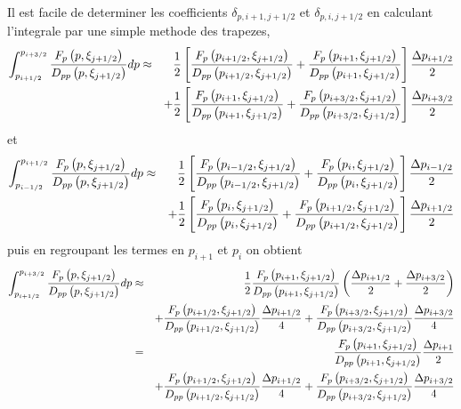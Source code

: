 Il est facile de determiner les coefficients $\delta_{p,i+1,j+1/2}$ et $%
\delta_{p,i,j+1/2}$ en calculant l'integrale par une simple methode des
trapezes, 
\begin{eqnarray*}
\int_{p_{i+1/2}}^{p_{i+3/2}}\frac{F_{p}\left(p,\xi_{j+1/2}\right)}{%
D_{pp}\left(p,\xi_{j+1/2}\right)}dp & \approx & \frac{1}{2}\left[\frac{%
F_{p}\left(p_{i+1/2},\xi_{j+1/2}\right)}{D_{pp}\left(p_{i+1/2},\xi_{j+1/2}%
\right)}+\frac{F_{p}\left(p_{i+1},\xi_{j+1/2}\right)}{D_{pp}\left(p_{i+1},%
\xi_{j+1/2}\right)}\right]\frac{\Delta p_{i+1/2}}{2} \\
& & +\frac{1}{2}\left[\frac{F_{p}\left(p_{i+1},\xi_{j+1/2}\right)}{%
D_{pp}\left(p_{i+1},\xi_{j+1/2}\right)}+\frac{F_{p}\left(p_{i+3/2},%
\xi_{j+1/2}\right)}{D_{pp}\left(p_{i+3/2},\xi_{j+1/2}\right)}\right]\frac{%
\Delta p_{i+3/2}}{2}
\end{eqnarray*}
et 
\begin{eqnarray*}
\int_{p_{i-1/2}}^{p_{i+1/2}}\frac{F_{p}\left(p,\xi_{j+1/2}\right)}{%
D_{pp}\left(p,\xi_{j+1/2}\right)}dp & \approx & \frac{1}{2}\left[\frac{%
F_{p}\left(p_{i-1/2},\xi_{j+1/2}\right)}{D_{pp}\left(p_{i-1/2},\xi_{j+1/2}%
\right)}+\frac{F_{p}\left(p_{i},\xi_{j+1/2}\right)}{D_{pp}\left(p_{i},%
\xi_{j+1/2}\right)}\right]\frac{\Delta p_{i-1/2}}{2} \\
& & +\frac{1}{2}\left[\frac{F_{p}\left(p_{i},\xi_{j+1/2}\right)}{%
D_{pp}\left(p_{i},\xi_{j+1/2}\right)}+\frac{F_{p}\left(p_{i+1/2},\xi_{j+1/2}%
\right)}{D_{pp}\left(p_{i+1/2},\xi_{j+1/2}\right)}\right]\frac{\Delta
p_{i+1/2}}{2}
\end{eqnarray*}
puis en regroupant les termes en $p_{i+1}$ et $p_{i}$ on obtient 
\begin{eqnarray*}
\int_{p_{i+1/2}}^{p_{i+3/2}}\frac{F_{p}\left(p,\xi_{j+1/2}\right)}{%
D_{pp}\left(p,\xi_{j+1/2}\right)}dp & \approx & \frac{1}{2}\frac{%
F_{p}\left(p_{i+1},\xi_{j+1/2}\right)}{D_{pp}\left(p_{i+1},\xi_{j+1/2}\right)%
}\left(\frac{\Delta p_{i+1/2}}{2}+\frac{\Delta p_{i+3/2}}{2}\right) \\
& & +\frac{F_{p}\left(p_{i+1/2},\xi_{j+1/2}\right)}{D_{pp}\left(p_{i+1/2},%
\xi_{j+1/2}\right)}\frac{\Delta p_{i+1/2}}{4}+\frac{F_{p}\left(p_{i+3/2},%
\xi_{j+1/2}\right)}{D_{pp}\left(p_{i+3/2},\xi_{j+1/2}\right)}\frac{\Delta
p_{i+3/2}}{4} \\
& = & \frac{F_{p}\left(p_{i+1},\xi_{j+1/2}\right)}{D_{pp}\left(p_{i+1},%
\xi_{j+1/2}\right)}\frac{\Delta p_{i+1}}{2} \\
& & +\frac{F_{p}\left(p_{i+1/2},\xi_{j+1/2}\right)}{D_{pp}\left(p_{i+1/2},%
\xi_{j+1/2}\right)}\frac{\Delta p_{i+1/2}}{4}+\frac{F_{p}\left(p_{i+3/2},%
\xi_{j+1/2}\right)}{D_{pp}\left(p_{i+3/2},\xi_{j+1/2}\right)}\frac{\Delta
p_{i+3/2}}{4}
\end{eqnarray*}
